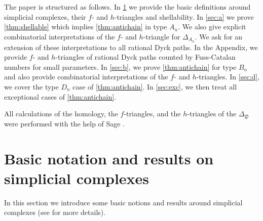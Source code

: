\documentclass[11pt]{amsart}
\def\fD{\mathfrak{D}}
\theoremstyle{plain}
\numberwithin{lemma}{\DefaultNumberTheoremWithin}
\numberwithin{theorem}{\DefaultNumberTheoremWithin}
\numberwithin{corollary}{\DefaultNumberTheoremWithin}
\numberwithin{proposition}{\DefaultNumberTheoremWithin}
\numberwithin{conjecture}{\DefaultNumberTheoremWithin}
\theoremstyle{definition}
\numberwithin{definition}{\DefaultNumberTheoremWithin}
\numberwithin{question}{\DefaultNumberTheoremWithin}
\numberwithin{problem}{\DefaultNumberTheoremWithin}
\theoremstyle{remark}
\numberwithin{remark}{\DefaultNumberTheoremWithin}
\numberwithin{example}{\DefaultNumberTheoremWithin}
\numberwithin{claim}{\DefaultNumberTheoremWithin}
\begin{document}
The paper is structured as follows. In \ref{sec:basic} we provide the basic definitions around
simplicial complexes, their $f$- and $h$-triangles and shellability. In \ref{sec:a} we prove
\ref{thm:shellable} which implies \ref{thm:antichain} in type $A_n$. We also give explicit combinatorial interpretations of the $f$- and
 $h$-triangle for $\Delta_{A_n}$. We ask for an extension of these interpretations to all
 rational Dyck paths. In the Appendix, we provide $f$- and $h$-triangles of rational Dyck paths counted by Fuss-Catalan numbers for small parameters.
 In \ref{sec:b}, we prove \ref{thm:antichain} for type $B_n$ and
also provide combinatorial interpretations of the $f$- and $h$-triangles.
In \ref{sec:d}, we cover the type $D_n$ case of \ref{thm:antichain}. In \ref{sec:exc}, we then
treat all exceptional cases of \ref{thm:antichain}.

All calculations of the homology, the $f$-triangles, and the $h$-triangles of the $\Delta_{\fD}$ were performed with the help of Sage \cite{sagemath}.


\section{Basic notation and results on simplicial complexes} \label{sec:basic}

In this section we introduce some basic notions and results around simplicial complexes
(see \cite{BjoWac96} for more details).
\end{document}
